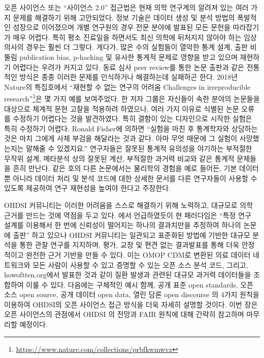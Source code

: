 \documentclass[10.5pt]{book}
\let\rmarkdownfootnote\footnote%
\def\footnote{\protect\rmarkdownfootnote}
\theoremstyle{definition}
\theoremstyle{definition}
\theoremstyle{definition}
\theoremstyle{remark}
\begin{document}
오픈 사이언스 또는 ``사이언스 2.0'' \citep{wiki:Science_2.0} 접근법은
현재 의학 연구계의 알려져 있는 여러 가지 문제를 해결하기 위해
고안되었다. 정보 기술은 데이터 생성 및 분석 방법의 폭발적인 성장으로
이어졌으며 개별 연구원의 경우 전문 분야에 발표된 모든 문헌을 따라잡기가
매우 어렵다. 특히 평소 진료일을 하면서도 최신 의학에 뒤처지지 않아야
하는 임상 의사의 경우는 훨씬 더 그렇다. 게다가, 많은 수의 실험들이
열악한 통계 설계, 출판 비뚤림 publication bias, p-hacking 및 유사한
통계적 문제로 영향을 받고 있으며 재현하기 어렵다는 우려가 커지고 있다.
동료 심사 peer review를 통한 논문 출판과 같은 전통적인 방식은 종종
이러한 문제를 인식하거나 해결하는데 실패하곤 한다. 2018년 Nature의
특집호에서 ``재현할 수 없는 연구의 어려움 Challenges in irreproducible
research''\footnote{\url{https://www.nature.com/collections/prbfkwmwvz}}은
몇 가지 예를 보여주었다. 한 저자 그룹은 자신들이 속한 분야의 논문들을
대상으로 체계적 문헌 고찰을 적용하려 하였으나, 여러 가지 이유로 식별된
논문 오류를 수정하기 어렵다는 것을 발견하였다. 특히 결함이 있는
디자인으로 시작한 실험은 특히 수정하기 어렵다. Ronald Fisher에 의하면
``실험을 마친 후 통계학자와 상담하는 것은 마치 그에게 사체 부검을
해달라는 것과 같다. 아마 무엇 때문에 그 실험이 사망했는지는 말해줄 수
있겠지요.'' \citep{wikiquote:Ronald_Fisher} 연구자들은 잘못된 통계적
유의성을 야기하는 부적절한 무작위 설계, 메타분석 상의 잘못된 계산,
부적절한 과거력 비교와 같은 통계적 문제들을 흔히 만난다.
\citep{allison_2016} 같은 호의 다른 논문에서는 물리학의 경험을 예로
들어든, 기본 데이터 뿐 아니라 데이터 처리 및 분석 코드에 대한 상세한
문서를 다른 연구자들이 사용할 수 있도록 제공하여 연구 재현성을 높여야
한다고 주장한다. \citep{Chen2018}

OHDSI 커뮤니티는 이러한 어려움을 스스로 해결하기 위해 노력하고, 대규모로
의학 근거를 만드는 것에 역점을 두고 있다. \citet{schuemie_2018b} 에서
언급하였듯이 현 패러다임은 ``특정 연구 설계를 이용해서 한 번에 신뢰성이
떨어지는 하나의 결과치만을 추정하여 하나의 논문에 출판'' 하고 있으나
OHDSI 커뮤니티는 일관되고 표준화된 방법에 기반한 대규모 분석을 통한 관찰
연구를 지지하며, 평가, 교정 및 편견 없는 결과발표를 통해 더욱 안정적이고
완전한 근거 기반을 만들 수 있다. 이는 OMOP CDM로 변환된 의료 데이터
네트워크와 모든 사람이 사용할 수 있고 증명할 수 있는 오픈 소스 분석
코드, 그리고, howoftten.org에서 발표한 것과 같이 질환 발생과 관련된
대규모 과거력 데이터들을 조합하여 이룰 수 있다. 다음에는 구체적인 예시
함께, 공개 표준 open standards, 오픈 소스 open source, 공개 데이터 open
data, 열린 담론 open discourse 의 4가지 원칙을 이용하여 OHDSI의 오픈
사이언스 접근 방식을 더욱 자세히 설명할 것이다. 이번 장은 오픈
사이언스의 관점에서 OHDSI 의 전망과 FAIR 원칙에 대해 간략히 참고하며
마무리할 예정이다.
\end{document}
